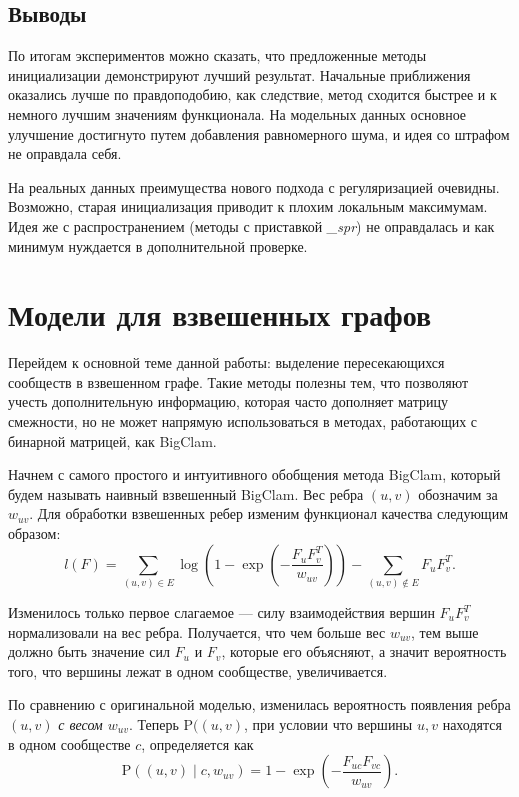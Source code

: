 \documentclass{ITaSconf}
\def\PP{\mathrm{P}}
\begin{document}
	\subsection{Выводы} 
	По итогам экспериментов можно сказать, что предложенные методы инициализации демонстрируют лучший результат. 
	Начальные приближения оказались лучше по правдоподобию, как следствие, метод сходится быстрее и к немного лучшим значениям функционала. 
	На модельных данных основное улучшение достигнуто путем добавления равномерного шума, и идея со штрафом не оправдала себя.
	
	На реальных данных преимущества нового подхода с регуляризацией очевидны. 
	Возможно, старая инициализация приводит к плохим локальным максимумам. 
	Идея же с распространением (методы с приставкой \textit{\_spr}) не оправдалась и как минимум нуждается в дополнительной проверке.
	
	\section{Модели для взвешенных графов}
	
	Перейдем к основной теме данной работы: выделение пересекающихся сообществ в взвешенном графе. 
	Такие методы полезны тем, что позволяют учесть дополнительную информацию, которая часто дополняет матрицу смежности, но не может напрямую использоваться в методах, работающих с бинарной матрицей, как BigClam.
	
	Начнем с самого простого и интуитивного обобщения метода BigClam, который будем называть наивный взвешенный BigClam.
	Вес ребра $(u,v)$ обозначим за $w_{uv}$. 
	Для обработки взвешенных ребер изменим функционал качества следующим образом:
	$$l(F) = \sum_{(u,v)\in E} \log\left(1 - \exp\left( - \dfrac{F_{u} F_{v}^T}{w_{uv}}\right)\right) - \sum_{(u,v) \notin E} F_{u} F_{v}^T.$$
	
	Изменилось только первое слагаемое --- силу взаимодействия вершин $F_u F_v^T$ нормализовали на вес ребра.
	Получается, что чем больше вес $w_{uv}$, тем выше должно быть значение сил $F_u$ и $F_v$, которые его объясняют, а значит вероятность того, что вершины лежат в одном сообществе, увеличивается.
	
	По сравнению с оригинальной моделью, изменилась вероятность появления ребра $(u,v)$ \textit{с весом $w_{uv}$}. Теперь $\PP((u,v)$, при условии что вершины $u,v$ находятся в одном сообществе $c$, определяется как
	$$\PP((u,v) \mid c, w_{uv})=1 - \exp\left(-\dfrac{F_{uc} F_{vc}}{w_{uv}}\right).$$
	
\end{document}
